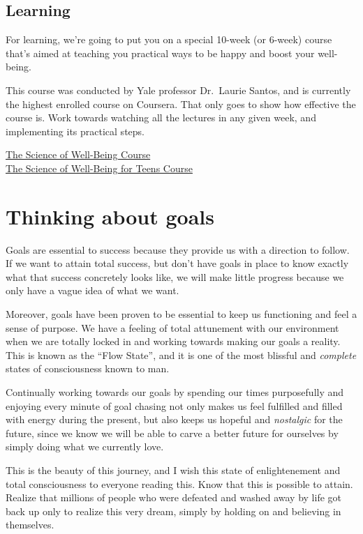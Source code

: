 \documentclass[
]{book}
\begin{document}
\hypertarget{learning}{%
\section{Learning}\label{learning}}

For learning, we're going to put you on a special 10-week (or 6-week) course that's aimed at teaching you practical ways to be happy and boost your well-being.

This course was conducted by Yale professor Dr.~Laurie Santos, and is currently the highest enrolled course on Coursera. That only goes to show how effective the course is. Work towards watching all the lectures in any given week, and implementing its practical steps.

\href{https://www.coursera.org/learn/the-science-of-well-being/home/week/1}{The Science of Well-Being Course}\\
\href{https://www.coursera.org/learn/the-science-of-well-being-for-teens/home/week/1}{The Science of Well-Being for Teens Course}

\hypertarget{thinking-about-goals}{%
\chapter{Thinking about goals}\label{thinking-about-goals}}

Goals are essential to success because they provide us with a direction to follow. If we want to attain total success, but don't have goals in place to know exactly what that success concretely looks like, we will make little progress because we only have a vague idea of what we want.

Moreover, goals have been proven to be essential to keep us functioning and feel a sense of purpose. We have a feeling of total attunement with our environment when we are totally locked in and working towards making our goals a reality. This is known as the ``Flow State'', and it is one of the most blissful and \emph{complete} states of consciousness known to man.

Continually working towards our goals by spending our times purposefully and enjoying every minute of goal chasing not only makes us feel fulfilled and filled with energy during the present, but also keeps us hopeful and \emph{nostalgic} for the future, since we know we will be able to carve a better future for ourselves by simply doing what we currently love.

This is the beauty of this journey, and I wish this state of enlightenement and total consciousness to everyone reading this. Know that this is possible to attain. Realize that millions of people who were defeated and washed away by life got back up only to realize this very dream, simply by holding on and believing in themselves.
\end{document}
